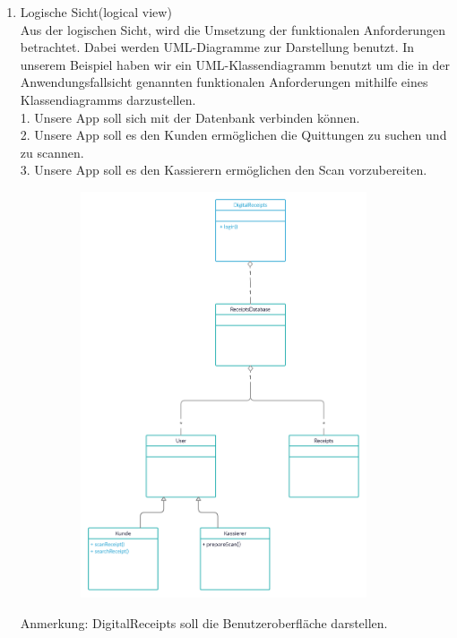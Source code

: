\begin{enumerate}[(a)]
\begin{enumerate}[1.]
        \item Logische Sicht(logical view)\\
        Aus der logischen Sicht, wird die Umsetzung der funktionalen Anforderungen betrachtet. Dabei werden UML-Diagramme zur Darstellung benutzt.
        In unserem Beispiel haben wir ein UML-Klassendiagramm benutzt um die in der Anwendungsfallsicht genannten funktionalen Anforderungen mithilfe eines Klassendiagramms darzustellen.\\
        1. Unsere App soll sich mit der Datenbank verbinden können. \\
        2. Unsere App soll es den Kunden ermöglichen die Quittungen zu suchen und zu scannen. \\
        3. Unsere App soll es den Kassierern ermöglichen den Scan vorzubereiten. \\
        \begin{itemize}
        \includegraphics[width=12cm,height=12cm,keepaspectratio]{src/u7/Class_Diagram_7.png}
         \end{itemize} 
        Anmerkung: DigitalReceipts soll die Benutzeroberfläche darstellen.
        

\end{enumerate}
\end{enumerate}

